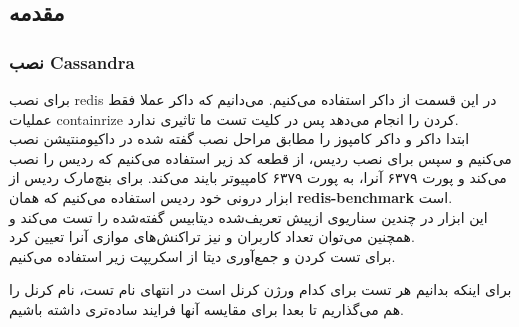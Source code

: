 \subsection{مقدمه}
\subsubsection{نصب Cassandra}
برای نصب 
redis 
در این قسمت از داکر
استفاده می‌کنیم.
می‌دانیم که داکر 
عملا فقط عملیات 
containrize 
کردن را انجام
می‌دهد
پس  در کلیت تست ما 
تاثیری ندارد.
\\
ابتدا داکر و داکر کامپوز را مطابق مراحل نصب گفته شده در
داکیومنتیشن نصب می‌کنیم و سپس 
برای نصب ردیس، از قطعه کد زیر استفاده می‌کنیم که 
ردیس را نصب می‌کند و پورت ۶۳۷۹ آنرا، به پورت ۶۳۷۹ کامپیوتر بایند می‌کند.
برای بنچ‌مارک ردیس از ابزار درونی خود ردیس استفاده می‌کنیم که همان 
\textbf{redis-benchmark}
است.
\\
این ابزار در چندین سناریوی ازپیش‌ تعریف‌‌شده دیتابیس گفته‌شده را تست می‌کند و همچنین می‌توان تعداد کاربران و نیز
تراکنش‌های موازی آنرا تعیین کرد.
\\
برای تست کردن و جمع‌آوری دیتا از اسکریپت زیر استفاده می‌کنیم.
\begin{latin}
\end{latin}
\noindent
برای اینکه بدانیم هر تست برای کدام ورژن کرنل است در انتهای نام تست، نام کرنل را هم می‌گذاریم تا بعدا برای 
مقایسه آنها فرایند ساده‌تری داشته باشیم.


